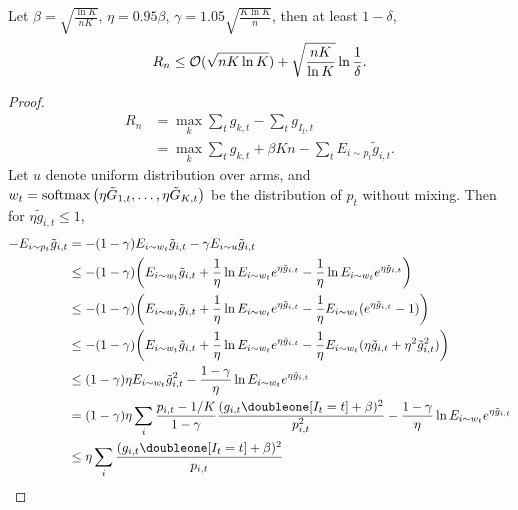 \begin{thm}
    Let $\beta=\sqrt{\frac{\ln K}{nK}}$, $\eta=0.95\beta$,
    $\gamma=1.05\sqrt{\frac{K\ln K}{n}}$, then \wprob at least $1-\delta$,
    \begin{equation}
        R_n\le \mathcal{O}(\sqrt{nK\ln K}) + \sqrt{\frac{nK}{\ln K}}\ln\frac{1}{\delta}.
    \end{equation}
\end{thm}
\begin{proof}
    \begin{align}
        R_n
            &= \max_k\sum_t g_{k,t} - \sum_t g_{I_t, t} \\
            &= \max_k\sum_t g_{k,t} + \beta K n - \sum_t E_{i\sim p_t}\tilde g_{i, t}.
    \end{align}
    Let $u$ denote uniform distribution over arms, and
    $w_t=\mathop{\mathrm{softmax}}\big(\eta\tilde G_{1,t},\dots,\eta\tilde G_{K,t}\big)$
    be the distribution of $p_t$ without mixing.
    Then for $\eta\tilde g_{i,t}\le 1$,
    \begin{align}
        - E_{i\sim p_t}\tilde g_{i, t}
            &= - (1-\gamma) E_{i\sim w_t} \tilde g_{i, t} - \gamma E_{i\sim u}\tilde g_{i, t}\\
            &\le - (1-\gamma)\bigg( E_{i\sim w_t} \tilde g_{i, t}
                +\frac{1}{\eta}\ln E_{i\sim w_t} e^{\eta\tilde g_{i,t}}
                -\frac{1}{\eta}\ln E_{i\sim w_t} e^{\eta\tilde g_{i,t}}
                \bigg) \\
            &\le - (1-\gamma)\bigg( E_{i\sim w_t} \tilde g_{i, t}
                +\frac{1}{\eta}\ln E_{i\sim w_t} e^{\eta\tilde g_{i,t}}
                -\frac{1}{\eta}E_{i\sim w_t} (e^{\eta\tilde g_{i,t}}-1)
                \bigg) \\
            &\le - (1-\gamma)\bigg( E_{i\sim w_t} \tilde g_{i, t}
                +\frac{1}{\eta}\ln E_{i\sim w_t} e^{\eta\tilde g_{i,t}}
                -\frac{1}{\eta}E_{i\sim w_t} (\eta\tilde g_{i,t} + \eta^2\tilde g_{i,t}^2)
                \bigg) \\
            &\le (1-\gamma)\eta
                E_{i\sim w_t} \tilde g_{i,t}^2
                - \frac{1-\gamma}{\eta} \ln E_{i\sim w_t} e^{\eta\tilde g_{i,t}} \\
            &= (1-\gamma)\eta
                \sum_{i}\frac{p_{i,t}-1/K}{1-\gamma} \frac{(g_{i,t}\doubleone[I_t=t]+\beta)^2}{p_{i,t}^2}
                - \frac{1-\gamma}{\eta} \ln E_{i\sim w_t} e^{\eta\tilde g_{i,t}} \\
            &\le \eta \sum_{i} \frac{(g_{i,t}\doubleone[I_t=t]+\beta)^2}{p_{i,t}}

\end{align}
\end{proof}
